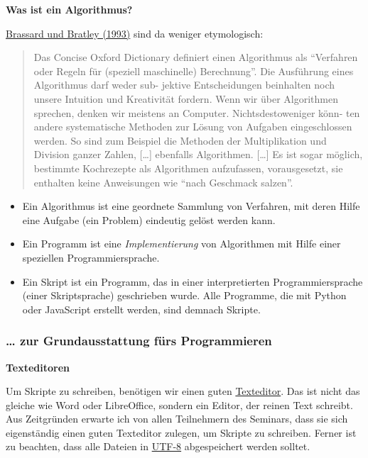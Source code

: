 \par\noindent\textbf{Was ist ein Algorithmus?}

{\href{http://bibliography.lingpy.org?key=Brassard1993}{Brassard und
Bratley (1993)} sind da weniger etymologisch:}

\begin{quote}
Das Concise Oxford Dictionary definiert einen Algorithmus als
``Verfahren oder Regeln für (speziell maschinelle) Berechnung''. Die
Ausführung eines Algorithmus darf weder sub- jektive Entscheidungen
beinhalten noch unsere Intuition und Kreativität fordern. Wenn wir über
Algorithmen sprechen, denken wir meistens an Computer.
Nichtsdestoweniger könn- ten andere systematische Methoden zur Lösung
von Aufgaben eingeschlossen werden. So sind zum Beispiel die Methoden
der Multiplikation und Division ganzer Zahlen, {[}\ldots{}{]} ebenfalls
Algorithmen. {[}\ldots{}{]} Es ist sogar möglich, bestimmte Kochrezepte
als Algorithmen aufzufassen, vorausgesetzt, sie enthalten keine
Anweisungen wie ``nach Geschmack salzen''.
\end{quote}



\begin{itemize}
\itemsep1pt\parskip0pt
\item
  Ein Algorithmus ist eine geordnete Sammlung von Verfahren, mit deren
  Hilfe eine Aufgabe (ein Problem) eindeutig gelöst werden kann.
\item
  Ein Programm ist eine \emph{Implementierung} von Algorithmen mit Hilfe
  einer speziellen Programmiersprache.
\item
  Ein Skript ist ein Programm, das in einer interpretierten
  Programmiersprache (einer Skriptsprache) geschrieben wurde. Alle
  Programme, die mit Python oder JavaScript erstellt werden, sind
  demnach Skripte.
\end{itemize}


\subsubsection{\texorpdfstring{{\ldots{} zur Grundausstattung fürs
Programmieren}}{\ldots{} zur Grundausstattung fürs Programmieren}}

\par\noindent\textbf{Texteditoren}

Um Skripte zu schreiben, benötigen wir einen guten
\href{http://de.wikipedia.org/wiki/Texteditor}{Texteditor}. Das ist
nicht das gleiche wie Word oder LibreOffice, sondern ein Editor, der
reinen Text schreibt. Aus Zeitgründen erwarte ich von allen Teilnehmern
des Seminars, dass sie sich eigenständig einen guten Texteditor zulegen,
um Skripte zu schreiben. Ferner ist zu beachten, dass alle Dateien in
\href{https://de.wikipedia.org/wiki/UTF-8}{UTF-8} abgespeichert werden
solltet.


